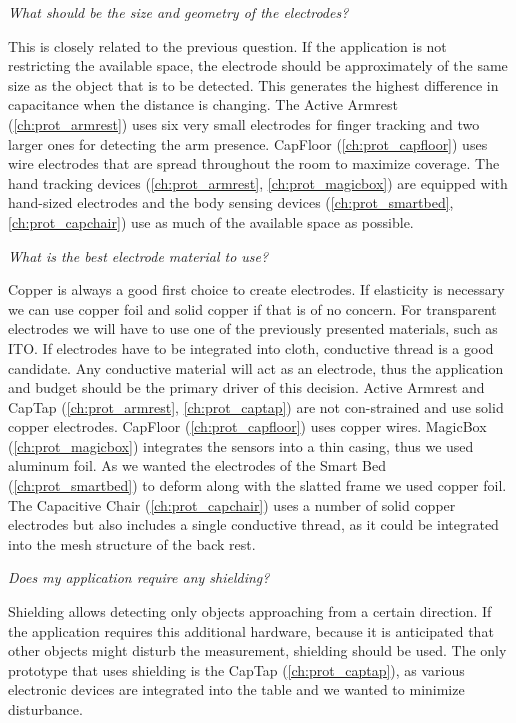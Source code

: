 \textit{What should be the size and geometry of the electrodes?}


This is closely related to the previous question. If the application is not restricting the available space, the electrode should be approximately of the same size as the object that is to be detected. This generates the highest difference in capacitance when the distance is changing. The Active Armrest (\ref{ch:prot_armrest}) uses six very small electrodes for finger tracking and two larger ones for detecting the arm presence. CapFloor (\ref{ch:prot_capfloor}) uses wire electrodes that are spread throughout the room to maximize coverage. The hand tracking devices (\ref{ch:prot_armrest}, \ref{ch:prot_magicbox}) are equipped with hand-sized electrodes and the body sensing devices (\ref{ch:prot_smartbed}, \ref{ch:prot_capchair}) use as much of the available space as possible.


\textit{What is the best electrode material to use?}


Copper is always a good first choice to create electrodes. If elasticity is necessary we can use copper foil and solid copper if that is of no concern. For transparent electrodes we will have to use one of the previously presented materials, such as ITO. If electrodes have to be integrated into cloth, conductive thread is a good candidate. Any conductive material will act as an electrode, thus the application and budget should be the primary driver of this decision. Active Armrest and CapTap (\ref{ch:prot_armrest}, \ref{ch:prot_captap}) are not con-strained and use solid copper electrodes. CapFloor (\ref{ch:prot_capfloor}) uses copper wires. MagicBox (\ref{ch:prot_magicbox}) integrates the sensors into a thin casing, thus we used aluminum foil. As we wanted the electrodes of the Smart Bed (\ref{ch:prot_smartbed}) to deform along with the slatted frame we used copper foil. The Capacitive Chair (\ref{ch:prot_capchair}) uses a number of solid copper electrodes but also includes a single conductive thread, as it could be integrated into the mesh structure of the back rest.


\textit{Does my application require any shielding?}


Shielding allows detecting only objects approaching from a certain direction. If the application requires this additional hardware, because it is anticipated that other objects might disturb the measurement, shielding should be used. The only prototype that uses shielding is the CapTap (\ref{ch:prot_captap}), as various electronic devices are integrated into the table and we wanted to minimize disturbance.

